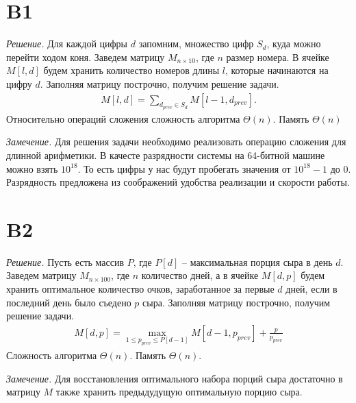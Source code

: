\documentclass[10pt, oneside, notitlepage]{article}
\newenvironment{solution}
    {\textit{Решение. }}
    {\par}
\newenvironment{remark}
    {\textit{Замечение.}}
    {\par}
\begin{document}
\section*{B1}
\begin{solution}
    Для каждой цифры $d$ запомним, множество цифр $S_d$, куда  можно перейти ходом коня.
    Заведем матрицу $M_{n \times 10}$, где $n$ размер номера.
    В ячейке $M[l, d]$ будем хранить количество номеров длины $l$,
    которые начинаются на цифру $d$.
    Заполняя матрицу построчно, получим решение задачи.
    \begin{align*}
        M[l, d] = \sum_{d_{prev} \in S_d} M[l - 1, d_{prev}].
    \end{align*}
    Относительно операций сложения сложность алгоритма $\Theta(n)$. Память $\Theta(n)$
\end{solution}
\begin{remark}
    Для решения задачи необходимо реализовать операцию сложения для длинной арифметики.
    В качесте разрядности системы на 64-битной машине можно взять $10^{18}$.
    То есть цифры у нас будут пробегать значения от $10^{18} - 1$ до $0$.
    Разрядность предложена из соображений удобства реализации и скорости работы.
\end{remark}


\section*{B2}
\begin{solution}
    Пусть есть массив $P$,
    где $P[d]$ -- максимальная порция сыра в день $d$.
    Заведем матрицу $M_{n \times 100}$, где $n$ количество дней,
    а в ячейке $M[d, p]$ будем хранить оптимальное количество очков, заработанное за первые $d$ дней,
    если в последний день было съедено $p$ сыра.
    Заполняя матрицу построчно, получим решение задачи.
    \begin{align*}
        M[d, p] = \max_{1 \leq p_{prev} \leq P[d-1]} M[d-1, p_{prev}] + \frac{p}{p_{prev}}
    \end{align*}
    Сложность алгоритма $\Theta(n)$. Память $\Theta(n)$.
\end{solution}
\begin{remark}
    Для восстановления оптимального набора порций сыра достаточно в матрицу $M$
    также хранить предыдудущую оптимальную порцию сыра.
\end{remark}
\end{document}
